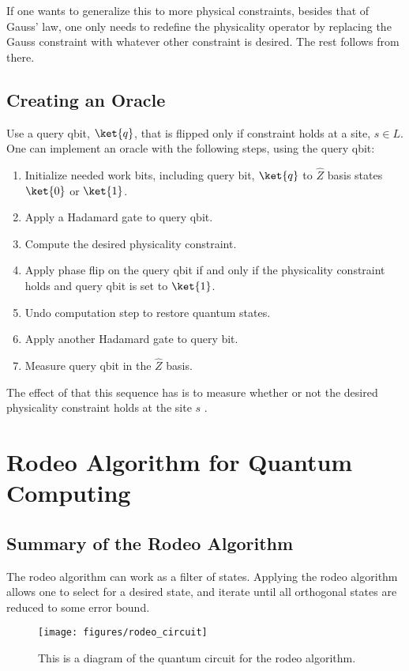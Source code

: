 \documentclass[
a4paper,
10pt,
twoside,
prd,
aps,
nofootinbib,
superscriptaddress,
floatfix,
preprintnumbers,
twocolumn
]{revtex4}
\begin{document}
If one wants to generalize this to more physical constraints, besides that of Gauss' law, one only needs to redefine the physicality operator by replacing the Gauss constraint with whatever other constraint is desired.
The rest follows from there.

\subsection{Creating an Oracle}
Use a query qbit, $\ket{q}$, that is flipped only if constraint holds at a site, $s \in L$.
One can implement an oracle with the following steps, using the query qbit\cite{osti_1609314}:
\begin{enumerate}
	\item
	Initialize needed work bits, including query bit, $\ket{q}$ to $\hat{Z}$ basis states $\ket{0}$ or $\ket{1}$.
	\item
	Apply a Hadamard gate to query qbit.
	\item
	Compute the desired physicality constraint.
	\item
	Apply phase flip on the query qbit if and only if the physicality constraint holds and query qbit is set to $\ket{1}$.
	\item
	Undo computation step to restore quantum states.
	\item
	Apply another Hadamard gate to query bit.
	\item
	Measure query qbit in the $\hat{Z}$ basis.
\end{enumerate}

The effect of that this sequence has is to measure whether or not the desired physicality constraint holds at the site $s$ \cite{osti_1609314}.

\section{Rodeo Algorithm for Quantum Computing}
\subsection{Summary of the Rodeo Algorithm\cite{Choi_2021}}
The rodeo algorithm can work as a filter of states.
Applying the rodeo algorithm allows one to select for a desired state, and iterate until all orthogonal states are reduced to some error bound.

\begin{figure}[H]
    \centering
	\texttt{[image: figures/rodeo\_circuit]}
	\caption{\cite{Choi_2021} This is a diagram of the quantum circuit for the rodeo algorithm.}
	\label{fig: rodeo_circuit}
\end{figure}
\end{document}
